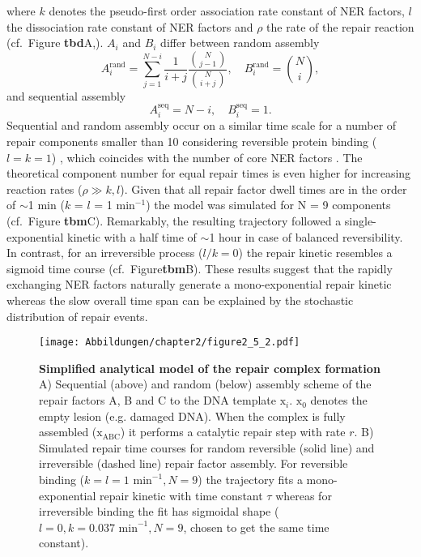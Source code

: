 where $k$ denotes the pseudo-first order association rate constant of NER factors, $l$ the dissociation rate constant of NER factors and $\rho$ the rate of the repair reaction (cf.\ Figure \textbf{tbd}A,\cite{Verbruggen2014}). $A_i$ and $B_i$ differ between random assembly
\begin{equation}
A_i^\text{rand}= \sum_{j=1}^{N-i}\frac{1}{i+j}\frac{{N \choose j-1}}{{N\choose i+j}} , \quad B_i^\text{rand} = {N\choose i},\label{Eqn:coefrand}
\end{equation} 
and sequential assembly           
\begin{equation}
A_i^\text{seq}= N-i , \quad B_i^\text{seq} = 1.\label{Eqn.coefseq}
\end{equation}
Sequential and random assembly occur on a similar time scale for a number of repair components smaller than 10 considering reversible protein binding ($l=k=1$) \cite{Terstiege2010}, which coincides with the number of core NER factors \cite{Luijsterburg2010}. The theoretical component number for equal repair times is even higher for increasing reaction rates ($\rho \gg k,l$). Given that all repair factor dwell times are in the order of $\sim$1 min ($k$ = $l$ = 1 $\text{min}^{-\text{1}}$) the model was simulated for N = 9 components (cf.\ Figure \textbf{tbm}C). Remarkably, the resulting trajectory followed a single-exponential kinetic with a half time of $\sim$1 hour in case of balanced reversibility. In contrast, for an irreversible process ($l/k = 0$) the repair kinetic resembles a sigmoid time course (cf.\ Figure\textbf{tbm}B). These results suggest that the rapidly exchanging NER factors naturally generate a mono-exponential repair kinetic whereas the slow overall time span can be explained by the stochastic distribution of repair events.

\begin{figure}[h]
\begin{center}
\texttt{[image: Abbildungen/chapter2/figure2\_5\_2.pdf]}
\caption{\textbf{Simplified analytical model of the repair complex formation} A) Sequential (above) and random (below) assembly scheme of the repair factors A, B and C to the DNA template $\text{x}_i$. $\text{x}_0$ denotes the empty lesion (e.g. damaged DNA). When the complex is fully assembled ($\text{x}_{\text{ABC}}$) it performs a catalytic repair step with rate $r$. B) Simulated repair time courses for random reversible (solid line) and irreversible (dashed line) repair factor assembly. For reversible binding ($k=l= \text{1 min}^{-1}, N=\text{9}$) the trajectory fits a mono-exponential repair kinetic with time constant $\tau$ whereas for irreversible binding the fit has sigmoidal shape ($l=\text{0}, k=\text{0.037 min}^{-1}, N=\text{9}$, chosen to get the same time constant).}
\label{fig:reactionTiming}
\end{center}
\end{figure}



